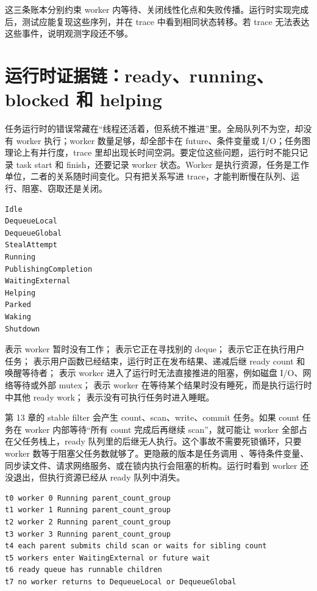 这三条账本分别约束 worker 内等待、关闭线性化点和失败传播。运行时实现完成后，测试应能复现这些序列，并在 trace 中看到相同状态转移。若 trace 无法表达这些事件，说明观测字段还不够。

\section{运行时证据链：ready、running、blocked 和 helping}

任务运行时的错误常藏在“线程还活着，但系统不推进”里。全局队列不为空，却没有 worker 执行；worker 数量足够，却全部卡在 future、条件变量或 I/O；任务图理论上有并行度，trace 里却出现长时间空洞。要定位这些问题，运行时不能只记录 task start 和 finish，还要记录 worker 状态。Worker 是执行资源，任务是工作单位，二者的关系随时间变化。只有把关系写进 trace，才能判断慢在队列、运行、阻塞、窃取还是关闭。

\begin{lstlisting}[numbers=none,caption={worker trace 状态}]
Idle
DequeueLocal
DequeueGlobal
StealAttempt
Running
PublishingCompletion
WaitingExternal
Helping
Parked
Waking
Shutdown
\end{lstlisting}

 表示 worker 暂时没有工作； 表示它正在寻找别的 deque； 表示它正在执行用户任务； 表示用户函数已经结束，运行时正在发布结果、递减后继 ready count 和唤醒等待者； 表示 worker 进入了运行时无法直接推进的阻塞，例如磁盘 I/O、网络等待或外部 mutex； 表示 worker 在等待某个结果时没有睡死，而是执行运行时中其他 ready work； 表示没有可执行任务时进入睡眠。

第 13 章的 stable filter 会产生 count、scan、write、commit 任务。如果 count 任务在 worker 内部等待“所有 count 完成后再继续 scan”，就可能让 worker 全部占在父任务栈上，ready 队列里的后继无人执行。这个事故不需要死锁循环，只要 worker 数等于阻塞父任务数就够了。更隐蔽的版本是任务调用 、等待条件变量、同步读文件、请求网络服务、或在锁内执行会阻塞的析构。运行时看到 worker 还没退出，但执行资源已经从 ready 队列中消失。

\begin{lstlisting}[numbers=none,caption={worker 被隐藏阻塞耗尽的 trace}]
t0 worker 0 Running parent_count_group
t1 worker 1 Running parent_count_group
t2 worker 2 Running parent_count_group
t3 worker 3 Running parent_count_group
t4 each parent submits child scan or waits for sibling count
t5 workers enter WaitingExternal or future wait
t6 ready queue has runnable children
t7 no worker returns to DequeueLocal or DequeueGlobal
\end{lstlisting}

